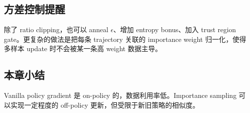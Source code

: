 \subsection{方差控制提醒}
除了 ratio clipping，也可以 anneal $\epsilon$、增加 entropy bonus、加入 trust region gate。更复杂的做法是把每条 trajectory 关联的 importance weight 归一化，使得多样本 update 时不会被某一条高 weight 数据主导。

\subsection{本章小结}

Vanilla policy gradient 是 on-policy 的，数据利用率低。Importance sampling 可以实现一定程度的 off-policy 更新，但受限于新旧策略的相似度。

